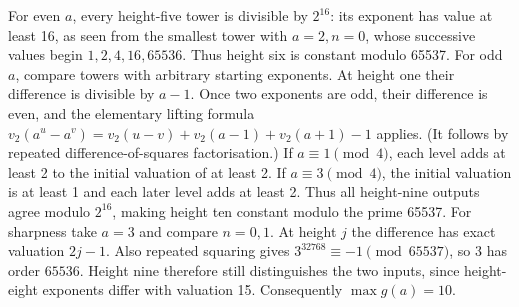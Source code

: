 For even $a$, every height-five tower is divisible by $2^{16}$: its exponent has value at least 16, as seen from the smallest tower with $a=2,n=0$, whose successive values begin $1,2,4,16,65536$. Thus height six is constant modulo 65537. For odd $a$, compare towers with arbitrary starting exponents. At height one their difference is divisible by $a-1$. Once two exponents are odd, their difference is even, and the elementary lifting formula $v_2(a^u-a^v)=v_2(u-v)+v_2(a-1)+v_2(a+1)-1$ applies. (It follows by repeated difference-of-squares factorisation.) If $a\equiv1\pmod4$, each level adds at least 2 to the initial valuation of at least 2. If $a\equiv3\pmod4$, the initial valuation is at least 1 and each later level adds at least 2. Thus all height-nine outputs agree modulo $2^{16}$, making height ten constant modulo the prime 65537. For sharpness take $a=3$ and compare $n=0,1$. At height $j$ the difference has exact valuation $2j-1$. Also repeated squaring gives $3^{32768}\equiv-1\pmod{65537}$, so 3 has order $65536$. Height nine therefore still distinguishes the two inputs, since height-eight exponents differ with valuation 15. Consequently $\boxed{\max g(a)=10}$.

